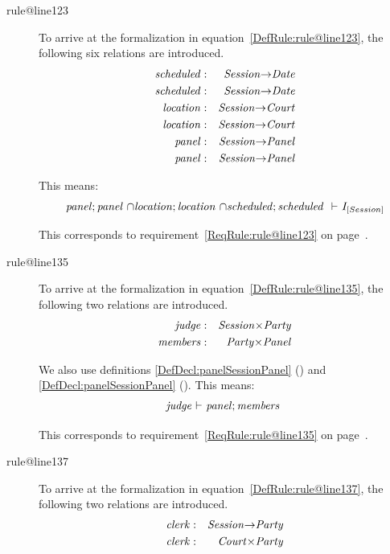 \documentclass[10pt,a4paper]{report}              %
\theoremstyle{plain}\theorembodyfont{\rmfamily}\newtheorem{definition}{Definition}[section]
\theoremstyle{plain}\theorembodyfont{\rmfamily}\newtheorem{designrule}[definition]{Requirement}
\def\id#1{\mbox{\em #1\/}}
\begin{document}
\begin{description}
\item[rule@line123]
To arrive at the formalization in equation~\ref{DefRule:rule@line123}, the following six relations are introduced.
\begin{eqnarray}
   {\id{scheduled}}&:&{\id{Session}}{\rightarrow}{\id{Date}}\label{DefDecl:scheduledSessionDate}\\
   {\id{scheduled}}&:&{\id{Session}}{\rightarrow}{\id{Date}}\label{DefDecl:scheduledSessionDate}\\
   {\id{location}}&:&{\id{Session}}{\rightarrow}{\id{Court}}\label{DefDecl:locationSessionCourt}\\
   {\id{location}}&:&{\id{Session}}{\rightarrow}{\id{Court}}\label{DefDecl:locationSessionCourt}\\
   {\id{panel}}&:&{\id{Session}}{\rightarrow}{\id{Panel}}\label{DefDecl:panelSessionPanel}\\
   {\id{panel}}&:&{\id{Session}}{\rightarrow}{\id{Panel}}\label{DefDecl:panelSessionPanel}
\end{eqnarray}

This means: 
\begin{equation}
   {\id{panel}};{\id{panel}}~{\cap}{\id{location}};{\id{location}}~{\cap}{\id{scheduled}};{\id{scheduled}}~\ {\vdash}\ I_{[Session]}\label{DefRule:rule@line123}
\end{equation}

This corresponds to requirement~\ref{ReqRule:rule@line123} on page~\pageref{ReqRule:rule@line123}.
\item[rule@line135]
To arrive at the formalization in equation~\ref{DefRule:rule@line135}, the following two relations are introduced.
\begin{eqnarray}
   {\id{judge}}&:&{\id{Session}}{\times}{\id{Party}}\label{DefDecl:judgeSessionParty}\\
   {\id{members}}&:&{\id{Party}}{\times}{\id{Panel}}\label{DefDecl:membersPartyPanel}
\end{eqnarray}

We also use definitions \ref{DefDecl:panelSessionPanel} ({}) and \ref{DefDecl:panelSessionPanel} ({}). 
This means: 
\begin{equation}
   {\id{judge}}\ {\vdash}\ {\id{panel}};{\id{members}}~\label{DefRule:rule@line135}
\end{equation}

This corresponds to requirement~\ref{ReqRule:rule@line135} on page~\pageref{ReqRule:rule@line135}.
\item[rule@line137]
To arrive at the formalization in equation~\ref{DefRule:rule@line137}, the following two relations are introduced.
\begin{eqnarray}
   {\id{clerk}}&:&{\id{Session}}{\rightarrow}{\id{Party}}\label{DefDecl:clerkSessionParty}\\
   {\id{clerk}}&:&{\id{Court}}{\times}{\id{Party}}\label{DefDecl:clerkCourtParty}
\end{eqnarray}


\end{description}
\end{document}
